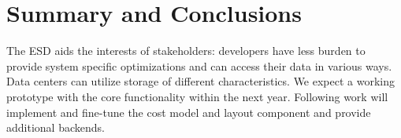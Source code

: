 \documentclass{../../template/esiwace-report}
\begin{document}





\chapter{Summary and Conclusions}

The ESD aids the interests of stakeholders: developers have less burden to provide system specific optimizations and can access their data in various ways.
Data centers can utilize storage of different characteristics.
We expect a working prototype with the core functionality within the next year.  Following work
 will implement and fine-tune the cost model and layout component and provide additional backends.







\acknowledgement




\end{document}
